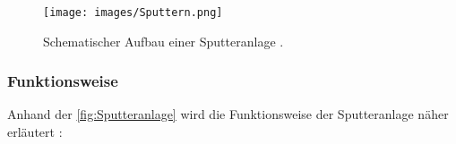 \documentclass{article} %
\begin{document}
\begin{figure}[htb!]
    \centering
    \texttt{[image: images/Sputtern.png]} %
    \captionsetup{labelfont=bf} %
    \caption{Schematischer Aufbau einer Sputteranlage \cite{keplinger2024}.}
    \label{fig:Sputteranlage}
\end{figure}





\vspace{1em}

\subsubsection{Funktionsweise} %

Anhand der \autoref{fig:Sputteranlage} wird die Funktionsweise der Sputteranlage näher erläutert \cite{keplinger2024}:
\end{document}

